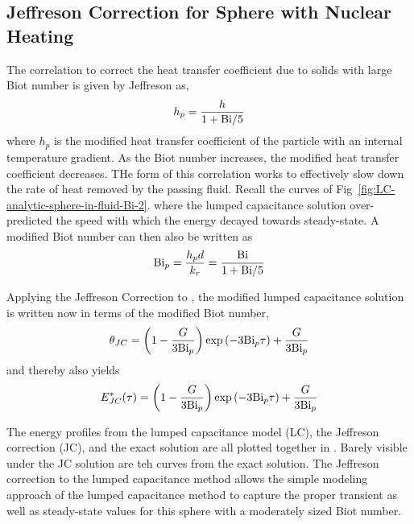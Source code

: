 \subsection{Jeffreson Correction for Sphere with Nuclear Heating}
The correlation to correct the heat transfer coefficient due to solids with large Biot number is given by Jeffreson as,\cite{jeffreson409}
\begin{equation}
	h_{p}=\frac{h}{1+\mathrm{Bi}/5}
\end{equation}
where $h_p$ is the modified heat transfer coefficient of the particle with an internal temperature gradient. As the Biot number increases, the modified heat transfer coefficient decreases. THe form of this correlation works to effectively slow down the rate of heat removed by the passing fluid. Recall the curves of Fig~\ref{fig:LC-analytic-sphere-in-fluid-Bi-2}. where the lumped capacitance solution over-predicted the speed with which the energy decayed towards steady-state. A modified Biot number can then also be written as
\begin{equation}\label{eq:jeffreson-correction-bip}
	\mathrm{Bi}_p = \frac{h_p d}{k_r} = \frac{\mathrm{Bi}}{1+\mathrm{Bi}/5}
\end{equation}

Applying the Jeffreson Correction to , the modified lumped capacitance solution is written now in terms of the modified Biot number,
\begin{equation}
\label{eq:theta-jc-bip}
	\theta_{JC}=\left(1-\frac{G}{3\mathrm{Bi}_p}\right)\exp\left(-3\mathrm{Bi}_p \tau\right) + \frac{G}{3\mathrm{Bi}_p}
\end{equation}
and thereby  also yields
\begin{equation}\label{eq:jc-energy-profile}
	E^*_{JC}(\tau) = \left(1-\frac{G}{3\mathrm{Bi}_p}\right)\exp\left(-3\mathrm{Bi}_p \tau\right) + \frac{G}{3\mathrm{Bi}_p}
\end{equation}

The energy profiles from the lumped capacitance model (LC), the Jeffreson correction (JC), and the exact solution are all plotted together in . Barely visible under the JC solution are teh curves from the exact solution. The Jeffreson correction to the lumped capacitance method allows the simple modeling approach of the lumped capacitance method to capture the proper transient as well as steady-state values for this sphere with a moderately sized Biot number. 

